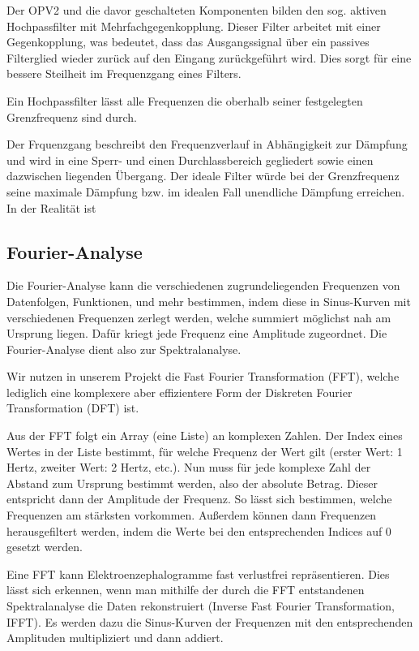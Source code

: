 \documentclass[10pt]{article}
\begin{document}
Der OPV2 und die davor geschalteten Komponenten bilden den sog. aktiven Hochpassfilter mit Mehrfachgegenkopplung. Dieser Filter arbeitet mit einer Gegenkopplung, was bedeutet, dass das Ausgangssignal über ein passives Filterglied wieder zurück auf den Eingang zurückgeführt wird. Dies sorgt für eine bessere Steilheit im Frequenzgang eines Filters. 

Ein Hochpassfilter lässt alle Frequenzen die oberhalb seiner festgelegten Grenzfrequenz sind durch. 

Der Frquenzgang beschreibt den Frequenzverlauf in Abhängigkeit zur Dämpfung und wird in eine Sperr- und einen Durchlassbereich gegliedert sowie einen dazwischen liegenden Übergang. Der ideale Filter würde bei der Grenzfrequenz seine maximale Dämpfung bzw. im idealen Fall unendliche Dämpfung erreichen. In der Realität ist 
 
\subsection{Fourier-Analyse}

Die Fourier-Analyse kann die verschiedenen zugrundeliegenden Frequenzen von Datenfolgen, Funktionen, und mehr bestimmen, indem diese in Sinus-Kurven mit verschiedenen Frequenzen zerlegt werden, welche summiert möglichst nah am Ursprung liegen. 
Dafür kriegt jede Frequenz eine Amplitude zugeordnet.
Die Fourier-Analyse dient also zur Spektralanalyse.

Wir nutzen in unserem Projekt die Fast Fourier Transformation (FFT), welche lediglich eine komplexere aber effizientere Form der Diskreten Fourier Transformation (DFT) ist.

Aus der FFT folgt ein Array (eine Liste) an komplexen Zahlen. 
Der Index eines Wertes in der Liste bestimmt, für welche Frequenz der Wert gilt (erster Wert: 1 Hertz, zweiter Wert: 2 Hertz, etc.). Nun muss für jede komplexe Zahl der Abstand zum Ursprung bestimmt werden, also der absolute Betrag. 
Dieser entspricht dann der Amplitude der Frequenz. So lässt sich bestimmen, welche Frequenzen am stärksten vorkommen. Außerdem können dann Frequenzen herausgefiltert werden, indem die Werte bei den entsprechenden Indices auf 0 gesetzt werden. 

Eine FFT kann Elektroenzephalogramme fast verlustfrei repräsentieren. 
Dies lässt sich erkennen, wenn man mithilfe der durch die FFT entstandenen Spektralanalyse die Daten rekonstruiert (Inverse Fast Fourier Transformation, IFFT). 
Es werden dazu die Sinus-Kurven der Frequenzen mit den entsprechenden Amplituden multipliziert und dann addiert.
\end{document}
